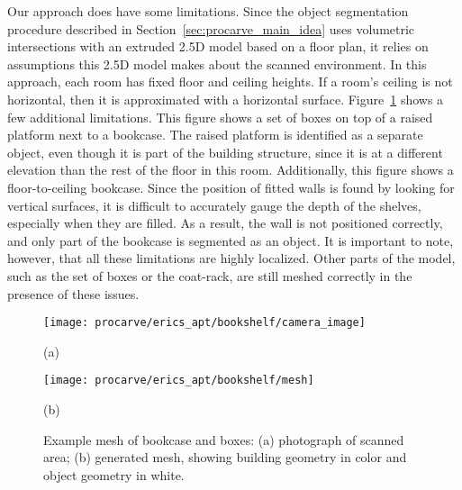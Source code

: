 \documentclass[12pt,onecolumn,oneside]{book}
\begin{document}
Our approach does have some limitations.  Since the object segmentation procedure described in Section~\ref{sec:procarve_main_idea} uses volumetric intersections with an extruded 2.5D model based on a floor plan, it relies on assumptions this 2.5D model makes about the scanned environment.  In this approach, each room has fixed floor and ceiling heights.  If a room's ceiling is not horizontal, then it is approximated with a horizontal surface.  Figure~\ref{fig:procarve_bookcase} shows a few additional limitations.  This figure shows a set of boxes on top of a raised platform next to a bookcase.  The raised platform is identified as a separate object, even though it is part of the building structure, since it is at a different elevation than the rest of the floor in this room.  Additionally, this figure shows a floor-to-ceiling bookcase.  Since the position of fitted walls is found by looking for vertical surfaces, it is difficult to accurately gauge the depth of the shelves, especially when they are filled.  As a result, the wall is not positioned correctly, and only part of the bookcase is segmented as an object.  It is important to note, however, that all these limitations are highly localized.  Other parts of the model, such as the set of boxes or the coat-rack, are still meshed correctly in the presence of these issues.

\begin{figure}[t]

	\begin{minipage}[t]{0.45\linewidth} %
		\centerline{\texttt{[image: procarve/erics\_apt/bookshelf/camera\_image]}}
		\centerline{(a)}
	\end{minipage}
	\hfill
	\begin{minipage}[t]{0.45\linewidth} %
		\centerline{\texttt{[image: procarve/erics\_apt/bookshelf/mesh]}}
		\centerline{(b)}
	\end{minipage}
	
	\caption[Example mesh of bookcase and boxes.]{Example mesh of bookcase and boxes: (a) photograph of scanned area; (b) generated mesh, showing building geometry in color and object geometry in white.}
	\label{fig:procarve_bookcase}
\end{figure}


\end{document}
